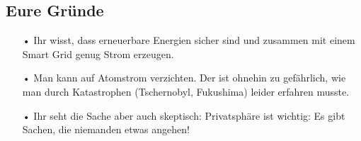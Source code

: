 \documentclass[11pt,a4paper,DIV=10,parskip=half,BCOR=0mm]{scrartcl}
\begin{document}
\subsection*{Eure Gründe}
\begin{enumerate}
	\item[•]Ihr wisst, dass erneuerbare Energien sicher sind und zusammen mit einem Smart Grid genug Strom erzeugen.
	\item[•]Man kann auf Atomstrom verzichten. Der ist ohnehin zu gefährlich, wie man durch 
	Katastrophen (Tschernobyl, Fukushima) leider erfahren musste. 
	\item[•] Ihr seht die Sache aber auch skeptisch: \glqq Privatsphäre ist wichtig: Es gibt Sachen, die niemanden etwas angehen!\grqq
	

\end{enumerate}
\end{document}
